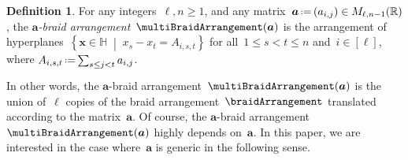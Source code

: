 \documentclass{amsart}
\newcommand{\darkblue}{\color{darkblue}} %
\theoremstyle{definition}
\newtheorem{definition}[theorem]{Definition}
\newcommand{\R}{\mathbb{R}} %
\renewcommand{\b}[1]{{\boldsymbol{#1}}} %
\newcommand{\set}[2]{\left\{ #1 \;\middle|\; #2 \right\}} %
\newcommand{\eqdef}{\mbox{\,\raisebox{0.2ex}{\scriptsize\ensuremath{\mathrm:}}\ensuremath{=}\,}} %
\newcommand{\defn}[1]{\textsl{\darkblue #1}} %
\renewcommand{\b}[1]{\boldsymbol{#1}} %
\newcommand{\HH}{\mathbb{H}} %
\begin{document}
%
%
%

\begin{definition}
\label{def:multiBraidArrangementPrecise}
For any integers~$\ell,n \geq 1$, and any matrix~$\b{a} \eqdef (a_{i,j}) \in M_{\ell,n-1}(\R)$, the \defn{$\b{a}$-braid arrangement}~$\multiBraidArrangement(\b{a})$ is the arrangement of hyperplanes~$\set{\b{x} \in \HH}{x_s - x_t = A_{i,s,t}}$ for all~${1 \le s < t \le n}$ and~$i \in [\ell]$, where $A_{i,s,t} \eqdef \smash{\sum_{s \le j < t} a_{i,j}}$.
\end{definition}

In other words, the $\b{a}$-braid arrangement~$\multiBraidArrangement(\b{a})$ is the union of~$\ell$ copies of the braid arrangement~$\braidArrangement$ translated according to the matrix~$\b{a}$.
Of course, the $\b{a}$-braid arrangement~$\multiBraidArrangement(\b{a})$ highly depends on~$\b{a}$.
In this paper, we are interested in the case where~$\b{a}$ is generic in the following sense.
\end{document}
